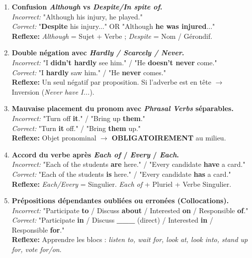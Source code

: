 \documentclass[11pt]{article}
\begin{document}
\begin{attention}
    \begin{enumerate}
        \item \textbf{Confusion \emph{Although} vs \emph{Despite/In spite of}.} \\ 
            \textit{Incorrect:} "Although his injury, he played." \\
            \textit{Correct:} "\textbf{Despite} his injury..." OR "Although \textbf{he was injured}..." \\
            \textbf{Reflexe:} \emph{Although} = Sujet + Verbe ; \emph{Despite} = Nom / Gérondif.
        \item \textbf{Double négation avec \emph{Hardly / Scarcely / Never}.} \\
            \textit{Incorrect:} "I \textbf{didn't hardly} see him." / "He \textbf{doesn't never} come." \\
            \textit{Correct:} "I \textbf{hardly} saw him." / "He \textbf{never} comes." \\
            \textbf{Reflexe:} Un seul négatif par proposition. Si l'adverbe est en tête $\to$ Inversion (\emph{Never have I...}).
        \item \textbf{Mauvaise placement du pronom avec \emph{Phrasal Verbs} séparables.} \\
            \textit{Incorrect:} "Turn off \textbf{it}." / "Bring up \textbf{them}." \\
            \textit{Correct:} "Turn \textbf{it} off." / "Bring \textbf{them} up." \\
            \textbf{Reflexe:} Objet pronominal $\to$ \textbf{OBLIGATOIREMENT} au milieu.
        \item \textbf{Accord du verbe après \emph{Each of} / \emph{Every} / \emph{Each}.} \\
            \textit{Incorrect:} "Each of the students \textbf{are} here." / "Every candidate \textbf{have} a card." \\
            \textit{Correct:} "Each of the students \textbf{is} here." / "Every candidate \textbf{has} a card." \\
            \textbf{Reflexe:} \emph{Each/Every} = Singulier. \emph{Each of} + Pluriel + Verbe Singulier.
        \item \textbf{Prépositions dépendantes oubliées ou erronées (Collocations).} \\
            \textit{Incorrect:} "Participate \textbf{to} / Discuss \textbf{about} / Interested \textbf{on} / Responsible \textbf{of}." \\
            \textit{Correct:} "Participate \textbf{in} / Discuss \textbf{\_\_\_} (direct) / Interested \textbf{in} / Responsible \textbf{for}." \\
            \textbf{Reflexe:} Apprendre les blocs : \emph{listen to, wait for, look at, look into, stand up for, vote for/on}.
    \end{enumerate}
\end{attention}
\end{document}
